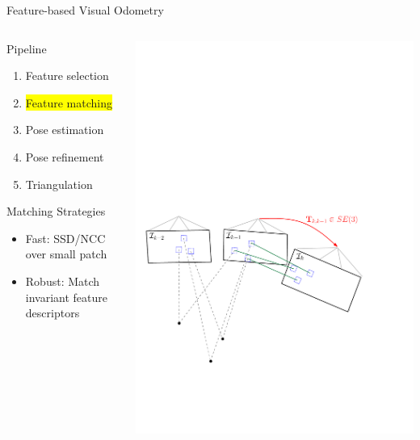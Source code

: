 \documentclass[10pt]{beamer}
\begin{document}
\begin{frame}{Feature-based Visual Odometry}
	\begin{columns}
	  \begin{column}{0.4\textwidth}
	  	\begin{block}{Pipeline}
		  	\begin{enumerate}
				\item Feature selection
				\item \colorbox{yellow}{Feature matching }
				\item Pose estimation
				\item Pose refinement
				\item Triangulation
			\end{enumerate}
		\end{block}
		\begin{block}{Matching Strategies}
			\begin{itemize}
				\item Fast: SSD/NCC over small patch
				\item Robust: Match invariant feature descriptors
			\end{itemize}
		\end{block}
	  \end{column}
	  \begin{column}{0.6\textwidth}
	    \includegraphics[width=\textwidth]{img/vo_pipeline_4}
	  \end{column}
	\end{columns}
\end{frame}
\end{document}
